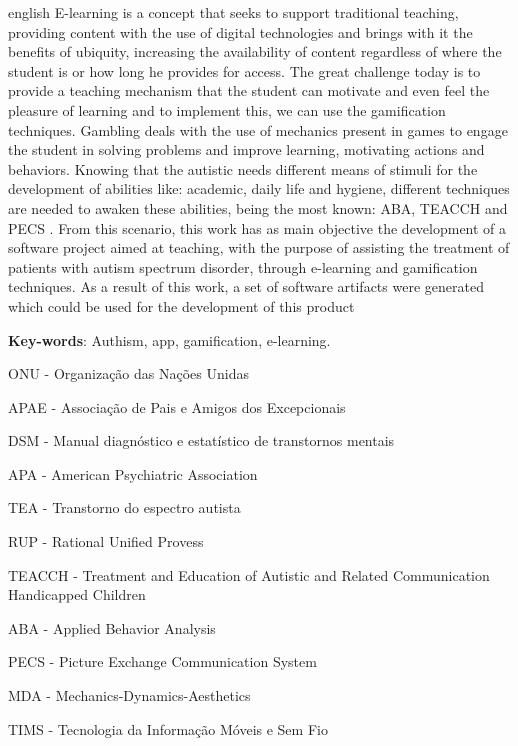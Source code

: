 \begin{resumo}[Abstract]
 \begin{otherlanguage*}{english}
 	E-learning is a concept that seeks to support traditional teaching, providing content with the use of digital technologies and brings with it the benefits of ubiquity, increasing the availability of content regardless of where the student is or how long he provides for access. The great challenge today is to provide a teaching mechanism that the student can motivate and even feel the pleasure of learning and to implement this, we can use the gamification techniques. Gambling deals with the use of mechanics present in games to engage the student in solving problems and improve learning, motivating actions and behaviors. Knowing that the autistic needs different means of stimuli for the development of abilities like: academic, daily life and hygiene, different techniques are needed to awaken these abilities, being the most known: ABA, TEACCH and PECS . From this scenario, this work has as main objective the development of a software project aimed at teaching, with the purpose of assisting the treatment of patients with autism spectrum disorder, through e-learning and gamification techniques. As a result of this work, a set of software artifacts were generated which could be used for the development of this product
   \vspace{\onelineskip}
 
   \noindent 
   \textbf{Key-words}: Authism, app, gamification, e-learning.
 \end{otherlanguage*}
\end{resumo}


\listoffigures*

\newpage
\listoftables*

\begin{siglas}
  \item ONU - Organização das Nações Unidas
  \item APAE - Associação de Pais e Amigos dos Excepcionais
  \item DSM -  Manual diagnóstico e estatístico de transtornos mentais
  \item APA - American Psychiatric Association
  \item TEA - Transtorno do espectro autista
  \item RUP - Rational Unified Provess
  \item TEACCH - Treatment and Education of Autistic and Related Communication Handicapped Children
  \item ABA - Applied Behavior Analysis
  \item PECS - Picture Exchange Communication System
  \item MDA - Mechanics-Dynamics-Aesthetics
  \item TIMS - Tecnologia da Informação Móveis e Sem Fio
\end{siglas}


\tableofcontents*
\cleardoublepage

